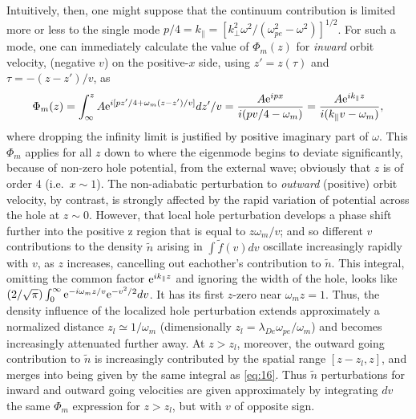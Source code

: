 \documentclass[12pt]{article}
\def\etothe#1{{\rm e}^{#1}}
\begin{document}
Intuitively, then, one might suppose that the continuum contribution is
limited more or less to the single mode
$p/4=k_\parallel= [k_\perp^2\omega^2/(\omega_{pe}^2-\omega^2)]^{1/2}$.
For such a mode, one can immediately calculate the value of $\Phi_m(z)$
for \emph{inward} orbit velocity, (negative $v$) on the positive-$x$
side, using $z'=z(\tau)$ and $\tau=-(z-z')/v$, as
\begin{equation}
  \label{eq:16}
  \Phi_m(z) = \int_{\infty}^zA{\rm e}^{i[pz'/4+\omega_m
    (z-z')/v]}dz'/v
  ={A{\rm e}^{ipx} \over i(pv/4-\omega_m)}={A{\rm e}^{ik_\parallel z} \over
    i(k_\parallel v-\omega_m)},
\end{equation}
where dropping the infinity limit is justified by positive imaginary
part of $\omega$.  This $\Phi_m$ applies for all $z$ down to where the
eigenmode begins to deviate significantly, because of non-zero hole
potential, from the external wave; obviously that $z$ is of order 4
(i.e.\ $x\sim 1$). The non-adiabatic perturbation to \emph{outward}
(positive) orbit velocity, by contrast, is strongly affected by the
rapid variation of potential across the hole at $z\sim 0$. However,
that local hole perturbation develops a phase shift further into the
positive z region that is equal to $z\omega_m/v$; and so different $v$
contributions to the density $\tilde n$ arising in
$\int \tilde f(v) dv$ oscillate increasingly rapidly with $v$, as $z$
increases, cancelling out eachother's contribution to $\tilde n$. This
integral, omitting the common factor $\etothe{ik_\parallel z}$ and
ignoring the width of the hole, looks like
$(2/\sqrt{\pi})\int_0^\infty \etothe{-i\omega_m
  z/v}\etothe{-v^2/2}dv$.  It has its first $z$-zero near
$\omega_m z=1$. Thus, the density influence of the localized hole
perturbation extends approximately a normalized distance
$z_l\simeq 1/\omega_m$ (dimensionally
$z_l= \lambda_{De}\omega_{pe}/\omega_m$) and becomes increasingly
attenuated further away. At $z>z_l$, moreover, the outward going
contribution to $\tilde n$ is increasingly contributed by the spatial
range $[z-z_l,z]$, and merges into being given by the same integral as
\ref{eq:16}.  Thus $\tilde n$ perturbations for inward and outward
going velocities are given approximately by integrating $dv$ the
same $\Phi_m$ expression for $z>z_l$, but with $v$ of opposite sign.
\end{document}
